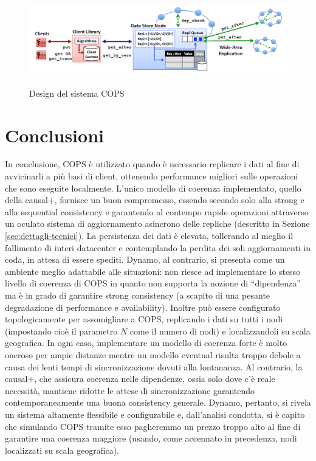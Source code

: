 \documentclass[twoside]{article}
\begin{document}
\begin{multicols}{2}
\begin{figure}[t]
\centering
\includegraphics[width=\textwidth,height=4cm]{img/COPSdesign.png}
\caption{Design del sistema COPS}
\label{fig:COPSdesign}
\end{figure}

\section{Conclusioni}
In conclusione, COPS è utilizzato quando è necessario replicare i dati al fine di avvicinarli a più basi di client, ottenendo performance migliori sulle operazioni che sono eseguite localmente. L'unico modello di coerenza implementato, quello della causal+, fornisce un buon compromesso, essendo secondo solo alla strong e alla sequential consistency e garantendo al contempo rapide operazioni attraverso un oculato sistema di aggiornamento asincrono delle repliche (descritto in Sezione \ref{sec:dettagli-tecnici}). La persistenza dei dati è elevata, tollerando al meglio il fallimento di interi datacenter e contemplando la perdita dei soli aggiornamenti in coda, in attesa di essere spediti.
Dynamo, al contrario, si presenta come un ambiente meglio adattabile alle situazioni: non riesce ad implementare lo stesso livello di coerenza di COPS in quanto non supporta la nozione di ``dipendenza'' ma è in grado di garantire strong consistency (a scapito di una pesante degradazione di performance e availability). Inoltre può essere configurato topologicamente per assomigliare a COPS, replicando i dati su tutti i nodi (impostando cioè il parametro $N$ come il numero di nodi) e localizzandoli su scala geografica. In ogni caso, implementare un modello di coerenza forte è molto oneroso per ampie distanze mentre un modello eventual risulta troppo debole a causa dei lenti tempi di sincronizzazione dovuti alla lontananza. Al contrario, la causal+, che assicura coerenza nelle dipendenze, ossia solo dove c'è reale necessità, mantiene ridotte le attese di sincronizzazione garantendo contemporaneamente una buona consistency generale. Dynamo, pertanto, si rivela un sistema altamente flessibile e configurabile e, dall'analisi condotta, si è capito che simulando COPS tramite esso pagheremmo un prezzo troppo alto al fine di garantire una coerenza maggiore (usando, come accennato in precedenza, nodi localizzati su scala geografica). 


\end{multicols}
\end{document}
